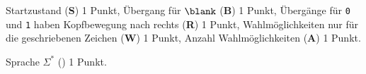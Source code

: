 \begin{bewertung}
\begin{teilaufgaben}
\item
Startzustand ({\bf S}) 1 Punkt,
Übergang für $\blank$ ({\bf B}) 1 Punkt,
Übergänge für \texttt{0} und \texttt{1} haben Kopfbewegung nach rechts
({\bf R}) 1 Punkt,
Wahlmöglichkeiten nur für die geschriebenen Zeichen ({\bf W}) 1 Punkt,
Anzahl Wahlmöglichkeiten ({\bf A}) 1 Punkt.
\item
Sprache $\Sigma^*$ ({\bf *}) 1 Punkt.
\end{teilaufgaben}
\end{bewertung}


